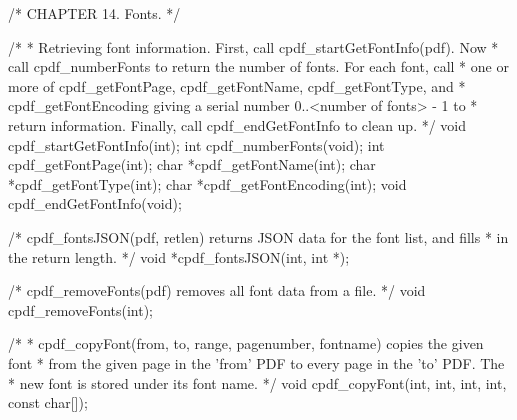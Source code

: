 /* CHAPTER 14. Fonts. */

/*
 * Retrieving font information. First, call cpdf_startGetFontInfo(pdf). Now
 * call cpdf_numberFonts to return the number of fonts. For each font, call
 * one or more of cpdf_getFontPage, cpdf_getFontName, cpdf_getFontType, and
 * cpdf_getFontEncoding giving a serial number 0..<number of fonts> - 1 to
 * return information. Finally, call cpdf_endGetFontInfo to clean up.
 */
void cpdf_startGetFontInfo(int);
int cpdf_numberFonts(void);
int cpdf_getFontPage(int);
char *cpdf_getFontName(int);
char *cpdf_getFontType(int);
char *cpdf_getFontEncoding(int);
void cpdf_endGetFontInfo(void);

/* cpdf_fontsJSON(pdf, retlen) returns JSON data for the font list, and fills
 * in the return length. */
void *cpdf_fontsJSON(int, int *);

/* cpdf_removeFonts(pdf) removes all font data from a file. */
void cpdf_removeFonts(int);

/*
 * cpdf_copyFont(from, to, range, pagenumber, fontname) copies the given font
 * from the given page in the 'from' PDF to every page in the 'to' PDF. The
 * new font is stored under its font name.
 */
void cpdf_copyFont(int, int, int, int, const char[]);

